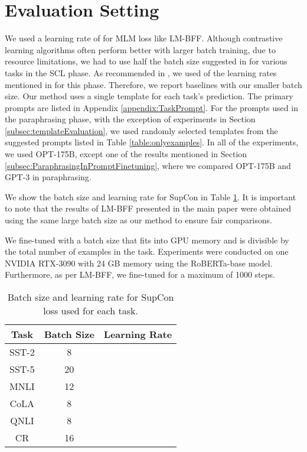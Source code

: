 \documentclass[11pt]{article}
\begin{document}
\renewcommand{\thealgorithm}{\Alph{section}.\arabic{algorithm}}

\section{Evaluation Setting}
\label{appendix:BatchSizeAndLearningDetails}

We used a learning rate of  for MLM loss like LM-BFF. Although contrastive learning algorithms often perform better with larger batch training, due to resource limitations, we had to use half the batch size suggested in  for various tasks in the SCL phase. As recommended in , we used  of the learning rates mentioned in  for this phase. Therefore, we report baselines with our smaller batch size. Our method uses a single template for each task's prediction. The primary prompts are listed in Appendix \ref{appendix:TaskPrompt}. For the prompts used in the paraphrasing phase, with the exception of experiments in Section \ref{subsec:templateEvaluation}, we used randomly selected templates from the suggested prompts listed in Table \ref{table:onlyexamples}. In all of the experiments, we used OPT-175B, except one of the results mentioned in Section \ref{subsec:ParaphrasingInPromptFinetuning}, where we compared OPT-175B and GPT-3 in paraphrasing.

We show the batch size and learning rate for SupCon in Table \ref{table:batchsizeandlearningrate}. It is important to note that the results of LM-BFF presented in the main paper were obtained using the same large batch size as our method to ensure fair comparisons.

We fine-tuned with a batch size that fits into GPU memory and is divisible by the total number of examples in the task. Experiments were conducted on one NVIDIA RTX-3090 with 24 GB memory using the RoBERTa-base model. Furthermore, as per LM-BFF, we fine-tuned for a maximum of 1000 steps.

\begin{table}[!ht]
    \centering
    \begin{tabular}{c|cc}
    \hline
    Task  & Batch Size & Learning Rate \\ \hline
    SST-2 & 8          &      \\
    SST-5 & 20         &      \\
    MNLI  & 12         &      \\
    CoLA  & 8          &      \\
    QNLI  & 8          &      \\
    CR    & 16         &      \\ \hline
    \end{tabular}
    \caption{Batch size and learning rate for SupCon loss used for each task.}
    \label{table:batchsizeandlearningrate}
\end{table}
\end{document}
